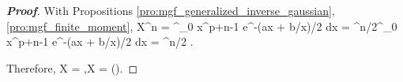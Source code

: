 \begin{proof}[\bf Proof]%
With Propositions \ref{pro:mgf_generalized_inverse_gaussian}, \ref{pro:mgf_finite_moment},
\beast
\E X^n = \int^\infty_0  x^{p+n-1} e^{-(ax + b/x)/2} dx = ^{n/2}\int^\infty_0  x^{p+n-1} e^{-(ax + b/x)/2} dx = ^{n/2} .
\eeast

Therefore,
\be
\E X =  ,\qquad \var X = \left(\right).
\ee

\end{proof}
